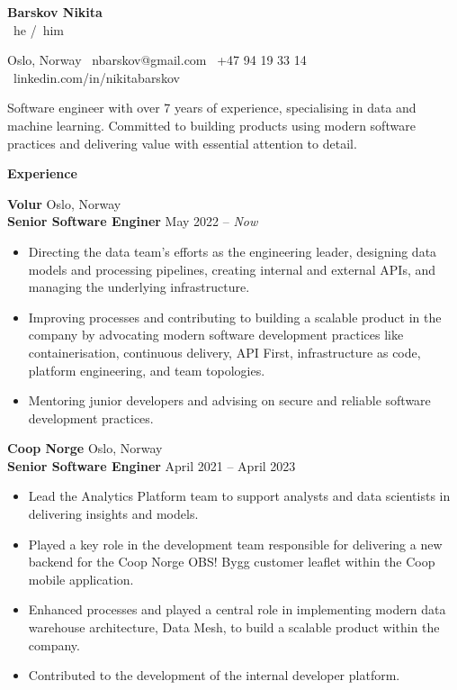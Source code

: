 \documentclass[12pt]{article}
\begin{document}
\begin{center}
	\textbf{Barskov Nikita} \\
	 \textbullet \ he \slash \ him \\
	\hrulefill
\end{center}

\begin{center}
	Oslo, Norway \textbullet \ nbarskov@gmail.com \textbullet \ +47 94 19 33 14 \textbullet \ linkedin.com/in/nikitabarskov \\
\end{center}

Software engineer with over 7 years of experience, specialising in data and machine learning.
Committed to building products using modern software practices and delivering value with
essential attention to detail.

\hrulefill

\begin{center}
	\textbf{Experience}
\end{center}

\textbf{Volur} \hfill Oslo, Norway \\
\textbf{Senior Software Enginer} \hfill May 2022 – \textit{Now}
\begin{itemize}[noitemsep, topsep=0pt, partopsep=0pt, parsep=0pt]
	\item Directing the data team's efforts as the engineering leader, designing data models and processing pipelines, creating internal and external APIs, and managing the underlying infrastructure.
	\item Improving processes and contributing to building a scalable product in the company by advocating modern software development practices like containerisation, continuous delivery, API First, infrastructure as code, platform engineering, and team topologies.
	\item Mentoring junior developers and advising on secure and reliable software development practices.
\end{itemize}

\vspace{10pt}

\textbf{Coop Norge} \hfill Oslo, Norway \\
\textbf{Senior Software Enginer} \hfill April 2021 – April 2023
\begin{itemize}[noitemsep, topsep=0pt, partopsep=0pt, parsep=0pt]
	\item Lead the Analytics Platform team to support analysts and data scientists in delivering insights and models.
	\item Played a key role in the development team responsible for delivering a new backend for the Coop Norge OBS! Bygg customer leaflet within the Coop mobile application.
	\item Enhanced processes and played a central role in implementing modern data warehouse architecture, Data Mesh, to build a scalable product within the company.
	\item Contributed to the development of the internal developer platform.
\end{itemize}
\end{document}
